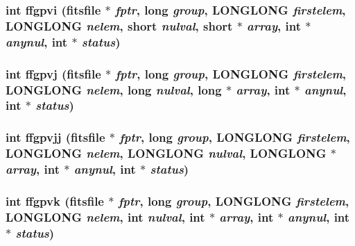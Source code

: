\subsubsection{\setlength{\rightskip}{0pt plus 5cm}int ffgpvi (\bf{fitsfile} $\ast$ {\em fptr}, long {\em group}, \bf{LONGLONG} {\em firstelem}, \bf{LONGLONG} {\em nelem}, short {\em nulval}, short $\ast$ {\em array}, int $\ast$ {\em anynul}, int $\ast$ {\em status})}\label{test_2shm__client_2fitsio_8h_5cf08cc899b11b18350ec1def017de1d}


\subsubsection{\setlength{\rightskip}{0pt plus 5cm}int ffgpvj (\bf{fitsfile} $\ast$ {\em fptr}, long {\em group}, \bf{LONGLONG} {\em firstelem}, \bf{LONGLONG} {\em nelem}, long {\em nulval}, long $\ast$ {\em array}, int $\ast$ {\em anynul}, int $\ast$ {\em status})}\label{test_2shm__client_2fitsio_8h_5b4c250bd7e498f28600d4850216cb56}


\subsubsection{\setlength{\rightskip}{0pt plus 5cm}int ffgpvjj (\bf{fitsfile} $\ast$ {\em fptr}, long {\em group}, \bf{LONGLONG} {\em firstelem}, \bf{LONGLONG} {\em nelem}, \bf{LONGLONG} {\em nulval}, \bf{LONGLONG} $\ast$ {\em array}, int $\ast$ {\em anynul}, int $\ast$ {\em status})}\label{test_2shm__client_2fitsio_8h_139575618933a88582c86f742063f0c4}


\subsubsection{\setlength{\rightskip}{0pt plus 5cm}int ffgpvk (\bf{fitsfile} $\ast$ {\em fptr}, long {\em group}, \bf{LONGLONG} {\em firstelem}, \bf{LONGLONG} {\em nelem}, int {\em nulval}, int $\ast$ {\em array}, int $\ast$ {\em anynul}, int $\ast$ {\em status})}\label{test_2shm__client_2fitsio_8h_0cbefb3447c77eb4e19523c9c0f36464}


